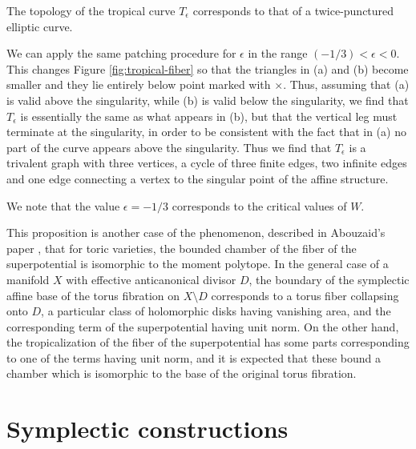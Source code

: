 \documentclass[12pt]{amsart}
\begin{document}
\begin{remark}
 The topology of the tropical curve $T_\epsilon$ corresponds to that of a
  twice-punctured elliptic curve.
\end{remark}

\begin{remark}
  We can apply the same patching procedure for $\epsilon$ in the range $(-1/3) < \epsilon < 0$. This changes Figure \ref{fig:tropical-fiber} so that the triangles in (a) and (b) become smaller and they lie entirely below point marked with $\times$. Thus, assuming that (a) is valid above the singularity, while (b) is valid below the singularity, we find that $T_\epsilon$ is essentially the same as what appears in (b), but that the vertical leg must terminate at the singularity, in order to be consistent with the fact that in (a) no part of the curve appears above the singularity. Thus we find that $T_\epsilon$ is a trivalent graph with
  three vertices, a cycle of three finite edges, two infinite edges
  and one edge connecting a vertex to the singular point of the
  affine structure.

  We note that the value $\epsilon = -1/3$ corresponds to the critical values of
  $W$.
  
\end{remark}

\begin{remark}
  This proposition is another case of the phenomenon, described in
  Abouzaid's paper \cite{abouzaid06}, that for toric varieties, the
  bounded chamber of the fiber of the superpotential is isomorphic to
  the moment polytope. In the general case of a manifold $X$ with
  effective anticanonical divisor $D$, the boundary of the symplectic
  affine base of the torus fibration on $X\setminus D$ corresponds to
  a torus fiber collapsing onto $D$, a particular class of holomorphic
  disks having vanishing area, and the corresponding term of the
  superpotential having unit norm. On the other hand, the
  tropicalization of the fiber of the superpotential has some parts
  corresponding to one of the terms having unit norm, and it is
  expected that these bound a chamber which is isomorphic to the base
  of the original torus fibration.
\end{remark}

\section{Symplectic constructions}
\label{sec:main-construction}
\end{document}
